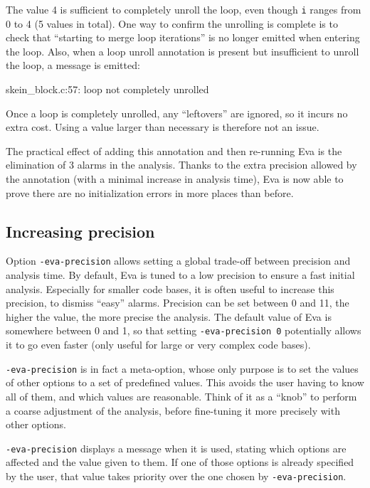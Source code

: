 \documentclass[web]{frama-c-book}
\newcommand{\Eva}{\textsf{Eva}}
\begin{document}
The value 4 is sufficient to completely unroll the loop, even though \verb|i|
ranges from 0 to 4 (5 values in total). One way to confirm the unrolling is
complete is to check that ``starting to merge loop iterations'' is no
longer emitted when entering the loop. Also, when a loop unroll annotation
is present but insufficient to unroll the loop, a message is emitted:

\begin{logs}
 skein_block.c:57: loop not completely unrolled
\end{logs}

Once a loop is completely unrolled, any ``leftovers'' are ignored, so it incurs
no extra cost. Using a value larger than necessary is therefore not an issue.

The practical effect of adding this annotation and then re-running \Eva{} is
the elimination of 3 alarms in the analysis. Thanks to the extra precision
allowed by the annotation (with a minimal increase in analysis time), \Eva{}
is now able to prove there are no initialization errors in more places than
before.

\subsection{Increasing precision}

Option \verb|-eva-precision| allows setting a global trade-off between
precision and analysis time. By default, \Eva{} is tuned to a low precision
to ensure a fast initial analysis. Especially for smaller code bases, it is
often useful to increase this precision, to dismiss ``easy'' alarms.
Precision can be set between 0 and 11, the higher the value, the more precise
the analysis. The default value of \Eva{} is somewhere between 0 and 1, so that
setting \verb|-eva-precision 0| potentially allows it to go even faster
(only useful for large or very complex code bases).

\verb|-eva-precision| is in fact a meta-option, whose only purpose is to set
the values of other options to a set of predefined values. This avoids the user
having to know all of them, and which values are reasonable. Think of it as a
``knob'' to perform a coarse adjustment of the analysis, before fine-tuning
it more precisely with other options.

\verb|-eva-precision| displays a message when it is used, stating which options
are affected and the value given to them. If one of those options is already
specified by the user, that value takes priority over the one chosen by
\verb|-eva-precision|.
\end{document}
